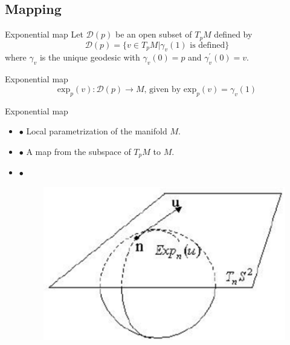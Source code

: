 \documentclass{beamer}
\begin{document}
\subsection{Mapping}
\begin{frame}{Exponential map}
Let $\mathcal{D}(p)$ be an open subset of $T_{p}M$ defined by
\begin{equation*}
\mathcal{D}(p) = \{ v \in T_{p}M | \gamma_{v}(1) \text{ is defined}\}
\end{equation*}
where $\gamma_{v}$ is the unique geodesic with $\gamma_{v}(0) = p$ and $\gamma^{\prime}_{v}(0) = v$.
\begin{alertblock}{{\color{blue} Exponential map}}
\begin{equation*}
  \text{exp}_{p}(v):\mathcal{D}(p) \rightarrow M \text{, given by } \text{exp}_{p}(v) = \gamma_{v}(1)
\end{equation*}
\end{alertblock}
\end{frame}

\begin{frame}{Exponential map}
\begin{itemize}
  \item $\bullet$ Local parametrization of the manifold $M$.
  \item $\bullet$ A map from the subspace of $T_{p}M$ to $M$.
  \item $\bullet$
  \begin{figure}
  \centering
  \includegraphics[scale=0.2]{The-exponential-map.png}
  \end{figure}
\end{itemize}
\end{frame}
\end{document}
